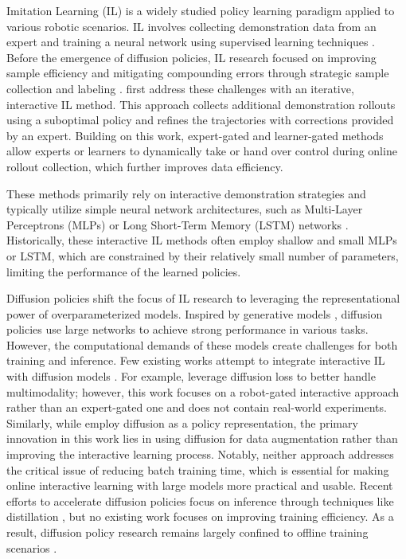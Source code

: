 Imitation Learning (IL) is a widely studied policy learning paradigm applied to various robotic scenarios. IL involves collecting demonstration data from an expert and training a neural network using supervised learning techniques \cite{zare2024survey}. Before the emergence of diffusion policies, IL research focused on improving sample efficiency and mitigating compounding errors through strategic sample collection and labeling \cite{spencer2021feedback}. \citet{ross2011reduction} first address these challenges with an iterative, interactive IL method. This approach collects additional demonstration rollouts using a suboptimal policy and refines the trajectories with corrections provided by an expert. Building on this work, expert-gated \cite{kelly2019hg, sun_mega_dagger} and learner-gated \cite{hoque2021thriftydagger, hoque2021lazydagger} methods allow experts or learners to dynamically take or hand over control during online rollout collection, which further improves data efficiency.

These methods primarily rely on interactive demonstration strategies and typically utilize simple neural network architectures, such as Multi-Layer Perceptrons (MLPs) \cite{jin2020geometric, loquercio2021learning, zhou2024developing} or Long Short-Term Memory (LSTM) networks \cite{cai2019vision, huang2020real, wu2024deep}. Historically, these interactive IL methods often employ shallow and small MLPs or LSTM, which are constrained by their relatively small number of parameters, limiting the performance of the learned policies.

Diffusion policies \cite{chi_dp} shift the focus of IL research to leveraging the representational power of overparameterized models. Inspired by generative models \cite{ho2020denoising, song2020denoising}, diffusion policies use large networks to achieve strong performance in various tasks. However, the computational demands of these models create challenges for both training and inference. Few existing works attempt to integrate interactive IL with diffusion models \cite{lee2024diff, zhang2024diffusion}. For example, \citet{lee2024diff} leverage diffusion loss to better handle multimodality; however, this work focuses on a robot-gated interactive approach rather than an expert-gated one and does not contain real-world experiments. Similarly, while \citet{zhang2024diffusion} employ diffusion as a policy representation, the primary innovation in this work lies in using diffusion for data augmentation rather than improving the interactive learning process. Notably, neither approach addresses the critical issue of reducing batch training time, which is essential for making online interactive learning with large models more practical and usable. Recent efforts to accelerate diffusion policies focus on inference through techniques like distillation \cite{prasad2024consistency, wang2024one}, but no existing work focuses on improving training efficiency. As a result, diffusion policy research remains largely confined to offline training scenarios \cite{sridhar2024nomad, sun2024comparative, ze20243d}. 